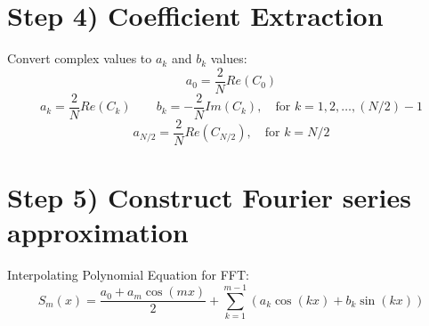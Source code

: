 \documentclass[12pt]{article}
\begin{document}
\section*{Step 4) Coefficient Extraction}
Convert complex values to $a_k$ and $b_k$ values:
\[a_0 = \frac{2}{N}Re(C_0)\]
\[a_k = \frac{2}{N}Re(C_k) \quad \quad b_k = -\frac{2}{N}Im(C_k), \quad \text{for } k=1,2,\ldots,(N/2)-1\]
\[a_{N/2} = \frac{2}{N}Re(C_{N/2}), \quad \text{for } k = N/2\]

\section*{Step 5) Construct Fourier series approximation}
Interpolating Polynomial Equation for FFT:
\[S_m(x) = \frac{a_0 + a_m\cos(mx)}{2} + \sum_{k=1}^{m-1}(a_k\cos(kx) + b_k\sin(kx))\]
\end{document}
